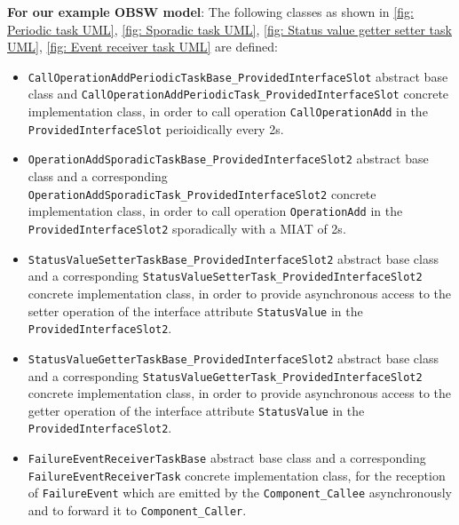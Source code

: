 \textbf{For our example OBSW model}: The following classes as shown in \cref{fig: Periodic task UML}, \cref{fig: Sporadic task UML}, \cref{fig: Status value getter setter task UML}, \cref{fig: Event receiver task UML} are defined:
\begin{itemize}
\item \texttt{CallOperationAdd\allowbreak Periodic\allowbreak TaskBase\_\allowbreak Provided\allowbreak Interface\allowbreak Slot} abstract base class and \texttt{Call\allowbreak OperationAdd\allowbreak Periodic\allowbreak Task\_\allowbreak Provided\allowbreak Interface\allowbreak Slot} concrete implementation class, in order to call operation \texttt{Call\allowbreak OperationAdd} in the \texttt{Provided\allowbreak Interface\allowbreak Slot} perioidically every 2s.
\item \texttt{OperationAdd\allowbreak Sporadic\allowbreak TaskBase\allowbreak \_\allowbreak Provided\allowbreak Interface\allowbreak Slot2} abstract base class and a corresponding \texttt{Operation\allowbreak Add\allowbreak Sporadic\allowbreak Task\_\allowbreak Provided\allowbreak Interface\allowbreak Slot2} concrete implementation class, in order to call operation \texttt{Operation\allowbreak Add} in the \texttt{Provided\allowbreak Interface\allowbreak Slot2} sporadically with a MIAT of 2s.
\item \texttt{StatusValue\allowbreak SetterTaskBase\allowbreak \_\allowbreak Provided\allowbreak Interface\allowbreak Slot2} abstract base class and a corresponding \texttt{Status\allowbreak Value\allowbreak Setter\allowbreak Task\allowbreak \_\allowbreak Provided\allowbreak Interface\allowbreak Slot2} concrete implementation class, in order to provide asynchronous access to the setter operation of the interface attribute \texttt{Status\allowbreak Value} in the \texttt{Provided\allowbreak Interface\allowbreak Slot2}.
\item \texttt{StatusValue\allowbreak GetterTaskBase\allowbreak \_\allowbreak Provided\allowbreak Interface\allowbreak Slot2} abstract base class and a corresponding \texttt{Status\allowbreak Value\allowbreak Getter\allowbreak Task\allowbreak \_\allowbreak Provided\allowbreak Interface\allowbreak Slot2} concrete implementation class, in order to provide asynchronous access to the getter operation of the interface attribute \texttt{Status\allowbreak Value} in the \texttt{Provided\allowbreak Interface\allowbreak Slot2}.
\item \texttt{Failure\allowbreak Event\allowbreak Receiver\allowbreak Task\allowbreak Base} abstract base class and a corresponding \texttt{Failure\allowbreak Event\allowbreak Receiver\allowbreak Task} concrete implementation class, for the reception of \texttt{Failure\allowbreak Event} which are emitted by the \texttt{Component\allowbreak\_Callee} asynchronously and to forward it to \texttt{Component\allowbreak\_Caller}. 
\end{itemize} 

